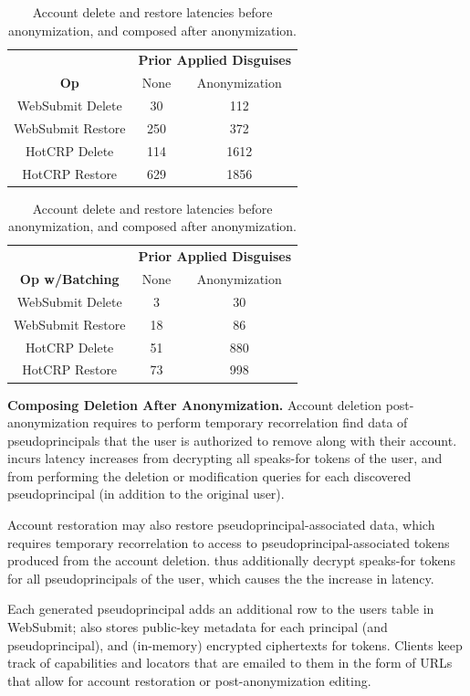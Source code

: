 \begin{table}[t!]
\begin{center}
\begin{tabular}{ c | c c }
& \multicolumn{2}{c}{\textbf{Prior Applied Disguises}} \\
    \textbf{Op} & None & Anonymization \\
\hline
WebSubmit Delete & 30 & 112 \\
WebSubmit Restore & 250 & 372\\
HotCRP Delete & 114 & 1612 \\
HotCRP Restore & 629 & 1856 \\
\end{tabular}
\quad
\begin{tabular}{ c | c c }
 & \multicolumn{2}{c}{\textbf{Prior Applied Disguises}} \\
    \textbf{Op w/Batching} & None & Anonymization \\
\hline
WebSubmit Delete  & 3 & 30 \\
WebSubmit Restore  & 18 & 86\\
HotCRP Delete  & 51 & 880 \\
HotCRP Restore  & 73 & 998 
\end{tabular}
\end{center}
\caption{Account delete and restore latencies before anonymization, and composed after anonymization.}
\label{tab:composition}
\end{table}

\textbf{Composing Deletion After Anonymization.}
Account deletion post-anonymization requires \sys to perform temporary
recorrelation find data of pseudoprincipals that the user is authorized to remove along with their
account. \sys incurs latency increases from decrypting all speaks-for tokens of the user, and from
performing the deletion or modification queries for each discovered pseudoprincipal (in addition to
the original user).

Account restoration may also restore pseudoprincipal-associated data, which requires temporary recorrelation
to access to pseudoprincipal-associated tokens produced from the account deletion.  \sys thus
additionally decrypt speaks-for tokens for all pseudoprincipals of the user, which causes the the
increase in latency.

Each generated pseudoprincipal adds an additional row to the users table in WebSubmit; \sys also
stores public-key metadata for each principal (and pseudoprincipal), and (in-memory) encrypted
ciphertexts for tokens.  Clients keep track of capabilities and locators that are emailed to them in
the form of URLs that allow for account restoration or post-anonymization editing.

